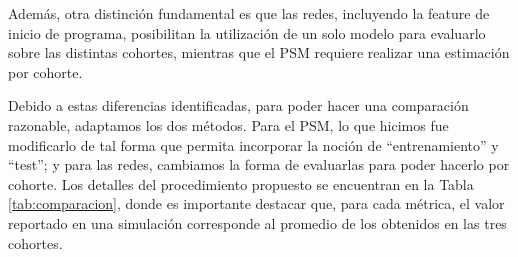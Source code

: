 \documentclass[../../main.tex]{subfiles}
\begin{document}
Además, otra distinción fundamental es que las redes, incluyendo la feature de inicio de
programa, posibilitan la utilización de un solo modelo para evaluarlo sobre las distintas
cohortes, mientras que el PSM requiere realizar una estimación por cohorte.

Debido a estas diferencias identificadas, para poder hacer una comparación razonable,
adaptamos los dos métodos. Para el PSM, lo que hicimos fue modificarlo de tal forma que
permita incorporar la noción de ``entrenamiento'' y ``test''; y para las redes, cambiamos
la forma de evaluarlas para poder hacerlo por cohorte. Los detalles del procedimiento
propuesto se encuentran en la Tabla \ref{tab:comparacion}, donde es importante destacar
que, para cada métrica, el valor reportado en una simulación corresponde al promedio de
los obtenidos en las tres cohortes.
\end{document}
